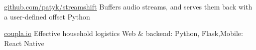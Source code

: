 
\begin{cvprojects}

	\cvproject
		{\href{https://github.com/patyk/streamshift}{github.com/patyk/streamshift}}
		{Buffers audio streams, and serves them back with a user-defined offset}
		{Python}

	\cvproject
		{\href{https://coupla.io}{coupla.io}}
		{Effective household logistics}
		{Web \& backend: Python, Flask,\newline Mobile: React Native}


\end{cvprojects}
